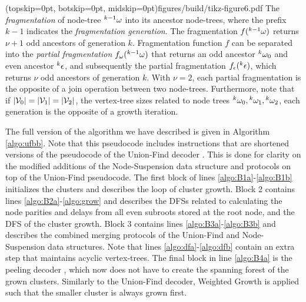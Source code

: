 \Figure[hbt](topskip=0pt, botskip=0pt, midskip=0pt){figures/build/tikz-figure6.pdf}{
  The \emph{fragmentation} of node-tree ${}^{k-1}\omega$ into its ancestor node-trees, where the prefix $k-1$ indicates the \emph{fragmentation generation}. The fragmentation $f({}^{k-1}\omega)$ returns $\nu+1$ odd ancestors of generation $k$. Fragmentation function $f$ can be separated into the \emph{partial fragmentation} $f_\omega({}^{k-1}\omega)$ that returns an odd ancestor ${}^{k}\omega_0$ and even ancestor ${}^{k}\epsilon$, and subsequently the partial fragmentation $f_\epsilon({}^{k}\epsilon)$, which returns $\nu$ odd ancestors of generation $k$. With $\nu=2$, each partial fragmentation is the opposite of a join operation between two node-trees. Furthermore, note that if $\lvert\mathcal{V}_0\rvert = \lvert\mathcal{V}_1\rvert = \lvert\mathcal{V}_2\rvert$, the vertex-tree sizes related to node trees ${}^{k}\omega_0, {}^{k}\omega_1, {}^{k}\omega_2$, each generation is the opposite of a growth iteration. \label{fig6}}

The full version of the algorithm we have described is given in Algorithm \ref{algo:ufbb}. Note that this pseudocode includes instructions that are shortened versions of the pseudocode of the Union-Find decoder \cite{delfosse2017almost}. This is done for clarity on the modified additions of the Node-Suspension data structure and protocols on top of the Union-Find pseudocode. The first block of lines \ref{algo:B1a}-\ref{algo:B1b} initializes the clusters and describes the loop of cluster growth. Block 2 contains lines \ref{algo:B2a}-\ref{algo:grow} and describes the DFSs related to calculating the node parities and delays from all even subroots stored at the root node, and the DFS of the cluster growth. Block 3 contains lines \ref{algo:B3a}-\ref{algo:B3b} and describes the combined merging protocols of the Union-Find and Node-Suspension data structures. Note that lines \ref{algo:dfa}-\ref{algo:dfb} contain an extra step that maintains acyclic vertex-trees. The final block in line \ref{algo:B4a} is the peeling decoder \cite{delfosse2017linear}, which now does not have to create the spanning forest of the grown clusters. Similarly to the Union-Find decoder, Weighted Growth is applied such that the smaller cluster is always grown first. 
